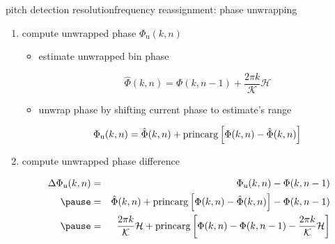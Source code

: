         \begin{frame}{pitch detection resolution}{frequency reassignment: phase unwrapping}

            \begin{enumerate}
                \item	compute unwrapped phase $\Phi_{\mathrm{u}}(k,n)$ 
                        \begin{itemize}
                            \item	estimate unwrapped bin phase
                                    \begin{footnotesize}
                                    \begin{equation*}\label{eq:phi_est}
                                        \hat{\Phi}(k,n) = \Phi(k,n-1) + \frac{2\pi k}{\mathcal{K}}\mathcal{H} 
                                    \end{equation*}
                                    \end{footnotesize}

                            \item<2->	unwrap phase by shifting current phase to estimate's range
                                    \begin{footnotesize}
                                    \begin{equation*}
                                        \Phi_{\mathrm{u}}(k,n) = \hat{\Phi}(k,n) + \operatorname*{princarg}\left[ \Phi(k,n) - \hat{\Phi}(k,n) \right]
                                    \end{equation*}
                                    \end{footnotesize}
                        \end{itemize}

                \item<3->	compute unwrapped phase difference
                        \begin{footnotesize}
                        \begin{eqnarray*}
                            \Delta\Phi_{\mathrm{u}}(k,n)	&=& \Phi_{\mathrm{u}}(k,n) - \Phi(k,n-1)\nonumber\\
                                                \pause
                                                &=& \hat{\Phi}(k,n) + \princarg\left[ \Phi(k,n) - \hat{\Phi}(k,n) \right] - \Phi(k,n-1)\nonumber \\
                                                \pause
                                                &=& \frac{2\pi k}{\mathcal{K}}\mathcal{H} + \princarg\left[ \Phi(k,n) - \Phi(k,n-1) - \frac{2\pi k}{\mathcal{K}}\mathcal{H} \right]\nonumber
                        \end{eqnarray*}
                        \end{footnotesize}
            \end{enumerate}
        
        \end{frame}
